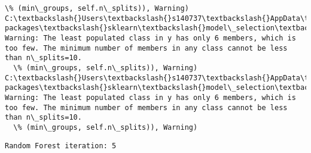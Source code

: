\documentclass[11pt]{article}
\begin{document}
\begin{Verbatim}[commandchars=\\\{\}]
  \% (min\_groups, self.n\_splits)), Warning)
C:\textbackslash{}Users\textbackslash{}s140737\textbackslash{}AppData\textbackslash{}Local\textbackslash{}Continuum\textbackslash{}anaconda3\textbackslash{}lib\textbackslash{}site-packages\textbackslash{}sklearn\textbackslash{}model\_selection\textbackslash{}\_split.py:605: Warning: The least populated class in y has only 6 members, which is too few. The minimum number of members in any class cannot be less than n\_splits=10.
  \% (min\_groups, self.n\_splits)), Warning)
C:\textbackslash{}Users\textbackslash{}s140737\textbackslash{}AppData\textbackslash{}Local\textbackslash{}Continuum\textbackslash{}anaconda3\textbackslash{}lib\textbackslash{}site-packages\textbackslash{}sklearn\textbackslash{}model\_selection\textbackslash{}\_split.py:605: Warning: The least populated class in y has only 6 members, which is too few. The minimum number of members in any class cannot be less than n\_splits=10.
  \% (min\_groups, self.n\_splits)), Warning)

    \end{Verbatim}

    \begin{Verbatim}[commandchars=\\\{\}]
Random Forest iteration: 5 

    \end{Verbatim}
\end{document}
